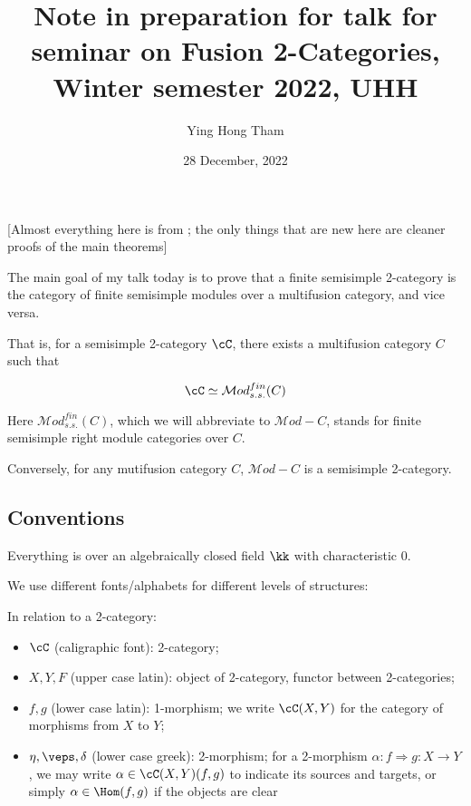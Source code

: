 \documentclass[12pt]{article}
\newcommand{\Mod}{{\mathcal{M}od}}
\begin{document}
\title{Note in preparation for talk for seminar on Fusion 2-Categories, Winter semester 2022, UHH}
\author{Ying Hong Tham}
\date{28 December, 2022}
\maketitle

[Almost everything here is from \cite{DRfusion};
the only things that are new here are
cleaner proofs of the main theorems]


The main goal of my talk today is to prove that
a finite semisimple 2-category is the
category of finite semisimple modules
over a multifusion category,
and vice versa.


That is, for a semisimple 2-category $\cC$,
there exists a multifusion category $C$
such that

\[
\cC \simeq \Mod_{s.s.}^{fin}(C)
\]

Here $\Mod_{s.s.}^{fin}(C)$,
which we will abbreviate to $\Mod-C$,
stands for finite semisimple right module categories over $C$.

Conversely, for any mutifusion category $C$,
$\Mod-C$ is a semisimple 2-category.



\subsection{Conventions}

Everything is over an algebraically closed field $\kk$
with characteristic 0.

We use different fonts/alphabets for different levels
of structures:

In relation to a 2-category:
\begin{itemize}
\item $\cC$ (caligraphic font): 2-category;

\item $X,Y,F$ (upper case latin): object of 2-category,
	functor between 2-categories;

\item $f,g$ (lower case latin): 1-morphism;
	we write $\cC(X,Y)$ for the category of morphisms
	from $X$ to $Y$;

\item $\eta,\veps,\delta$ (lower case greek): 2-morphism;
	for a 2-morphism $\alpha: f \Rightarrow g: X \to Y$,
	we may write $\alpha \in \cC(X,Y)(f,g)$
	to indicate its sources and targets,
	or simply $\alpha \in \Hom(f,g)$ if the objects are clear
\end{itemize}
\end{document}
